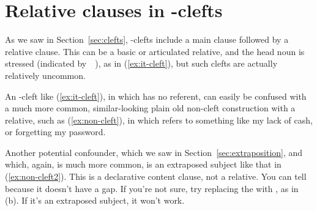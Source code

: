 \ea
    \z
\z
{}

\section{Relative clauses in -clefts}

As we saw in Section~\ref{sec:clefts}, -clefts include a main clause followed by a relative clause. This can be a basic or articulated relative, and the head noun is stressed (indicated by~~), as in (\ref{ex:it-cleft}), but such clefts are actually relatively uncommon.

\ea \label{ex:it-cleft}
    \z
\z
An -cleft like (\ref{ex:it-cleft}), in which  has no referent, can easily be confused with a much more common, similar-looking plain old non-cleft construction with a relative, such as (\ref{ex:non-cleft}), in which  refers to something like my lack of cash, or forgetting my password. 

\begin{samepage}
    \ea \label{ex:non-cleft}
        \z
    \z
\end{samepage}

Another potential confounder, which we saw in Section~\ref{sec:extraposition}, and which, again, is much more common, is an extraposed subject like that in (\ref{ex:non-cleft2}). This is a declarative content clause, not a relative. You can tell because it doesn't have a gap. If you're not sure, try replacing the  with , as in (b). If it's an extraposed subject, it won't work.

